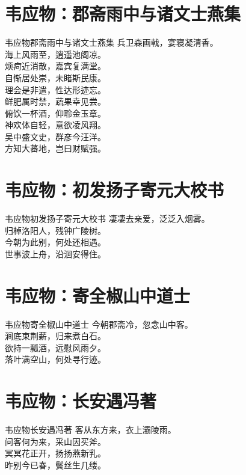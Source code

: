 \documentclass[12pt,oneside,a5paper]{book}
\begin{document}
\chapter{韦应物：郡斋雨中与诸文士燕集}
\begin{poemzh}{韦应物}{郡斋雨中与诸文士燕集}
兵卫森画戟，宴寝凝清香。\\
海上风雨至，逍遥池阁凉。\\
烦疴近消散，嘉宾复满堂。\\
自惭居处崇，未睹斯民康。\\
理会是非遣，性达形迹忘。\\
鲜肥属时禁，蔬果幸见尝。\\
俯饮一杯酒，仰聆金玉章。\\
神欢体自轻，意欲凌风翔。\\
吴中盛文史，群彦今汪洋。\\
方知大蕃地，岂曰财赋强。\\ 
\end{poemzh}

\chapter{韦应物：初发扬子寄元大校书}
\begin{poemzh}{韦应物}{初发扬子寄元大校书}
凄凄去亲爱，泛泛入烟雾。\\
归棹洛阳人，残钟广陵树。\\
今朝为此别，何处还相遇。\\
世事波上舟，沿洄安得住。\\ 
\end{poemzh}

\chapter{韦应物：寄全椒山中道士}
\begin{poemzh}{韦应物}{寄全椒山中道士}
今朝郡斋冷，忽念山中客。\\
涧底束荆薪，归来煮白石。\\
欲持一瓢酒，远慰风雨夕。\\
落叶满空山，何处寻行迹。\\ 
\end{poemzh}

\chapter{韦应物：长安遇冯著}
\begin{poemzh}{韦应物}{长安遇冯著}
客从东方来，衣上灞陵雨。\\
问客何为来，采山因买斧。\\
冥冥花正开，扬扬燕新乳。\\
昨别今已春，鬓丝生几缕。\\ 
\end{poemzh}
\end{document}
